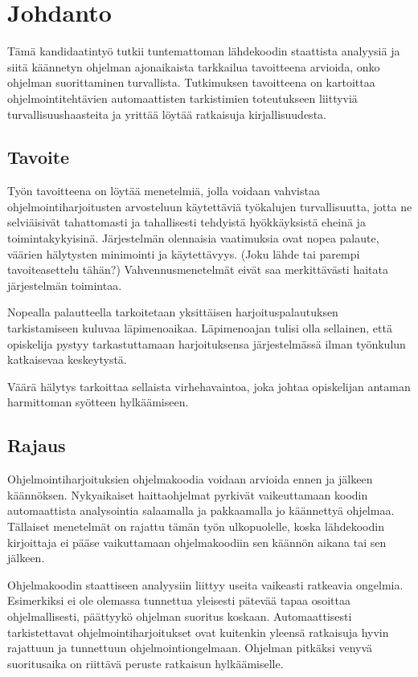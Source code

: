 

\section{Johdanto}
\label{sec:johd}

Tämä kandidaatintyö tutkii tuntemattoman lähdekoodin staattista
analyysiä ja siitä käännetyn ohjelman ajonaikaista tarkkailua tavoitteena
arvioida, onko ohjelman suorittaminen turvallista. Tutkimuksen tavoitteena on
kartoittaa ohjelmointitehtävien automaattisten tarkistimien toteutukseen
liittyviä turvallisuushaasteita ja yrittää löytää ratkaisuja kirjallisuudesta.

\subsection{Tavoite}

Työn tavoitteena on löytää menetelmiä, jolla voidaan vahvistaa
ohjelmointiharjoitusten arvosteluun käytettäviä työkalujen turvallisuutta, jotta ne selviäisivät
tahattomasti ja tahallisesti tehdyistä hyökkäyksistä eheinä ja
toimintakykyisinä. Järjestelmän olennaisia vaatimuksia ovat nopea palaute,
väärien hälytysten minimointi ja käytettävyys. (Joku lähde tai parempi
tavoiteasettelu tähän?) Vahvennusmenetelmät eivät saa merkittävästi haitata
järjestelmän toimintaa.

Nopealla palautteella tarkoitetaan yksittäisen harjoituspalautuksen
tarkistamiseen kuluvaa läpimenoaikaa. Läpimenoajan tulisi olla sellainen, että
opiskelija pystyy tarkastuttamaan harjoituksensa järjestelmässä ilman työnkulun
katkaisevaa keskeytystä.

Väärä hälytys tarkoittaa sellaista virhehavaintoa, joka johtaa opiskelijan
antaman harmittoman syötteen hylkäämiseen.

\subsection{Rajaus}

Ohjelmointiharjoituksien ohjelmakoodia voidaan arvioida ennen ja jälkeen
käännöksen. Nykyaikaiset haittaohjelmat pyrkivät vaikeuttamaan koodin
automaattista analysointia salaamalla ja pakkaamalla jo käännettyä ohjelmaa.
Tällaiset menetelmät on rajattu tämän työn ulkopuolelle, koska lähdekoodin
kirjoittaja ei pääse vaikuttamaan ohjelmakoodiin sen käännön aikana tai sen
jälkeen.

Ohjelmakoodin staattiseen analyysiin liittyy useita vaikeasti ratkeavia
ongelmia. Esimerkiksi ei ole olemassa tunnettua yleisesti pätevää
tapaa osoittaa ohjelmallisesti, päättyykö ohjelman suoritus koskaan.
Automaattisesti tarkistettavat ohjelmointiharjoitukset ovat kuitenkin yleensä
ratkaisuja hyvin rajattuun ja tunnettuun ohjelmointiongelmaan. Ohjelman pitkäksi
venyvä suoritusaika on riittävä peruste ratkaisun hylkäämiselle.

